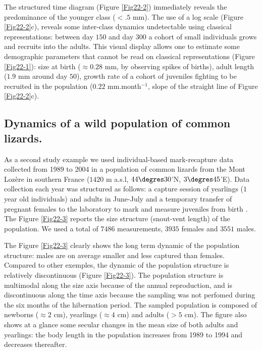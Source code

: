The structured time diagram (Figure \ref{Fig22-2}) immediately reveals the predominance of the
younger class ($<.5$ mm). The use of a log scale (Figure \ref{Fig22-2}c),
reveals some inter-class dynamics undetectable using classical representations: between day
$150$ and day $300$ a cohort of small individuals grows and recruits into the
adults. This visual display allows one to estimate some demographic parameters
that cannot be read on classical representations (Figure \ref{Fig22-1}): size at
birth ($\approx0.28$ mm, by observing spikes of births), adult length ($1.9$ mm around
day $50$), growth rate of a cohort of juveniles fighting to be recruited in the
population ($0.22$ mm.month$^{-1}$, slope of the straight line of Figure
\ref{Fig22-2}c).

\subsection{Dynamics of a wild population of common lizards.}

As a second study example we used individual-based mark-recapture data collected
from 1989 to 2004 in a population of common lizards from the Mont Lozère in
southern France ($1420$ m a.s.l, $44\degres30$’N, $3\degres45$’E). Data collection
each year was structured as follows: a capture session of yearlings ($1$ year
old individuals) and adults in June-July and a temporary transfer of pregnant females to the
laboratory to mark and measure juveniles from birth \autocites{le-galliard2010a}.
The Figure \ref{Fig22-3} reports the size structure (snout-vent length) of the
population. We used a total of $7486$ measurements, $3935$ females and $3551$
males.

The Figure \ref{Fig22-3} clearly shows the long term dynamic of the population structure:
males are on average smaller and less captured than females. Compared to other
exemples, the dynamic of the population structure is relatively discontinuous
(Figure \ref{Fig22-3}). The population structure is multimodal along the size axis because of
the annual reproduction, and is discontinuous along the time axis because the
sampling was not perfomed during the six months of the hibernation period. The
sampled population is composed of newborns ($\approx2$ cm), yearlings ($\approx4$ cm) and
adults ($>5$ cm). The figure also shows at a glance some secular changes in the
mean size of both adults and yearlings: the body length in the population increases from
1989 to 1994 \autocites{chamaille-jammes2006a} and decreases
thereafter.

